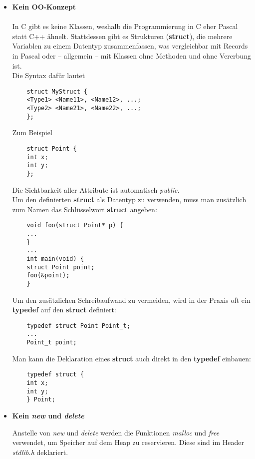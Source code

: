 \documentclass[
  accentcolor=tud1c,	%
  colorbacktitle,		%
  inverttitle,			%
  german,				%
  twoside
]{tudexercise}
\begin{document}
\begin{itemize}
	\item[] \textbf{Kein OO-Konzept}\\\\
	In C gibt es keine Klassen, weshalb die Programmierung in C eher Pascal statt C++ ähnelt.
	Stattdessen gibt es Strukturen (\textbf{struct}), die mehrere Variablen zu einem Datentyp zusammenfassen, was vergleichbar mit Records in Pascal oder -- allgemein -- mit Klassen ohne Methoden und ohne Vererbung ist.\\
	
	Die Syntax dafür lautet
	\begin{lstlisting}
	struct MyStruct {
	<Type1> <Name11>, <Name12>, ...;
	<Type2> <Name21>, <Name22>, ...;
	};
	\end{lstlisting} 
	
	Zum Beispiel
	\begin{lstlisting}
	struct Point {
	int x;
	int y;
	};
	\end{lstlisting}
	
	Die Sichtbarkeit aller Attribute ist automatisch \emph{public}. \\
	
	Um den definierten \textbf{struct} als Datentyp zu verwenden, muss man zusätzlich zum Namen das Schlüsselwort \textbf{struct} angeben:
	
	\begin{lstlisting}
	void foo(struct Point* p) {
	...
	}
	...
	int main(void) {
	struct Point point;
	foo(&point);
	}
	\end{lstlisting}
	
	Um den zusätzlichen Schreibaufwand zu vermeiden, wird in der Praxis oft ein \textbf{typedef} auf den \textbf{struct} definiert:
	
	\begin{lstlisting}
	typedef struct Point Point_t;
	...
	Point_t point;
	\end{lstlisting}
	
	Man kann die Deklaration eines \textbf{struct} auch direkt in den \textbf{typedef} einbauen:
	\begin{lstlisting}
	typedef struct {
	int x;
	int y;	
	} Point;
	\end{lstlisting}
	
	\item[] \textbf{Kein \emph{new} und \emph{delete}}
	
	Anstelle von \emph{new} und \emph{delete} werden die Funktionen \emph{malloc} und \emph{free} verwendet, um Speicher auf dem Heap zu reservieren. 
	Diese sind im Header \emph{stdlib.h} deklariert.
	

\end{itemize}
\end{document}
